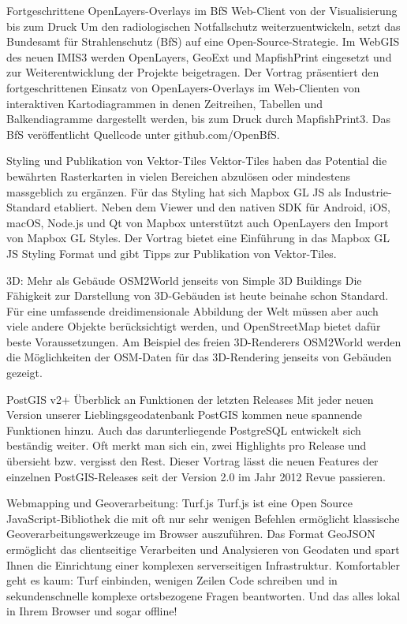 %
{Fortgeschrittene OpenLayers-Overlays im BfS Web-Client}%
{von der Visualisierung bis zum Druck}%
{%
Um den radiologischen Notfallschutz weiterzuentwickeln, setzt das Bundesamt für Strahlenschutz (BfS) auf eine Open-Source-Strategie. Im WebGIS des neuen IMIS3 werden OpenLayers, GeoExt und MapfishPrint eingesetzt und zur Weiterentwicklung der Projekte beigetragen. Der Vortrag präsentiert den fortgeschrittenen Einsatz von OpenLayers-Overlays im Web-Clienten von interaktiven Kartodiagrammen in denen Zeitreihen, Tabellen und Balkendiagramme dargestellt werden, bis zum Druck durch MapfishPrint3. Das BfS veröffentlicht Quellcode unter github.com/OpenBfS.%
}

%
{Styling und Publikation von Vektor-Tiles}%
{}%
{%
Vektor-Tiles haben das Potential die bewährten Rasterkarten in vielen Bereichen abzulösen oder mindestens massgeblich zu ergänzen. Für das Styling hat sich Mapbox GL JS als Industrie-Standard etabliert. Neben dem Viewer und den nativen SDK für Android, iOS, macOS, Node.js und Qt von Mapbox unterstützt auch OpenLayers den Import von Mapbox GL Styles.
Der Vortrag bietet eine Einführung in das Mapbox GL JS Styling Format und gibt Tipps zur Publikation von Vektor-Tiles.%
}

%
{3D: Mehr als Gebäude}%
{OSM2World jenseits von Simple 3D Buildings}%
{%
Die Fähigkeit zur Darstellung von 3D-Gebäuden ist heute beinahe schon Standard. Für eine umfassende dreidimensionale Abbildung der Welt müssen aber auch viele andere Objekte berücksichtigt werden, und OpenStreetMap bietet dafür beste Voraussetzungen. Am Beispiel des freien 3D-Renderers OSM2World werden die Möglichkeiten der OSM-Daten für das 3D-Rendering jenseits von Gebäuden gezeigt.%
}


%
{PostGIS v2+}%
{Überblick an Funktionen der letzten Releases}%
{%
Mit jeder neuen Version unserer Lieblingsgeodatenbank PostGIS kommen neue spannende Funktionen hinzu. Auch das darunterliegende PostgreSQL entwickelt sich beständig weiter. Oft merkt man sich ein, zwei Highlights pro Release und übersieht bzw. vergisst den Rest. Dieser Vortrag lässt die neuen Features der einzelnen PostGIS-Releases seit der Version 2.0 im Jahr 2012 Revue passieren.%
}

%
{Webmapping und Geoverarbeitung: Turf.js}%
{}%
{%
Turf.js ist eine Open Source JavaScript-Bibliothek die mit oft nur sehr wenigen Befehlen ermöglicht klassische Geoverarbeitungswerkzeuge im Browser auszuführen. Das Format GeoJSON ermöglicht das clientseitige Verarbeiten und Analysieren von Geodaten und spart Ihnen die Einrichtung einer komplexen serverseitigen Infrastruktur. Komfortabler geht es kaum: Turf einbinden, wenigen Zeilen Code schreiben und in sekundenschnelle komplexe ortsbezogene Fragen beantworten. Und das alles lokal in Ihrem Browser und sogar offline!%
}

